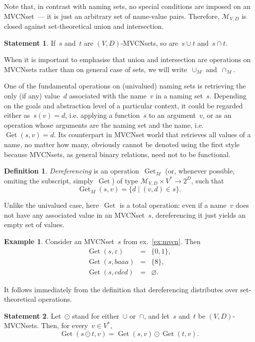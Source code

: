 \documentclass{article}
\theoremstyle{definition}
\newtheorem{Df}{Definition}
\newtheorem{St}{Statement}
\newtheorem{Ex}{Example}
\newcommand{\setcharmvcn}{M}
\newcommand{\setsymbol}[3]{\mathcal{#1}_{#2,#3}}
\newcommand{\setmvcn}[2]{\setsymbol{\setcharmvcn}{#1}{#2}}
\newcommand{\deref}{\operatorname{Get}}
\begin{document}
Note that, in contrast with naming sets, no special conditions are imposed
on an MVCNset~--- it is just an arbitrary set of name-value pairs.
Therefore, $\setmvcn{V}{D}$ is closed against set-theoretical union
and intersection.
\begin{St}\label{st:mvcn-setop}
If~$s$ and~$t$ are $(V,D)$-MVCNsets, so are~$s\cup t$ and~$s\cap t$.
\end{St}

When it is important to emphasise that union and intersection are operations
on MVCNsets rather than on general case of sets, we will
write~$\cup_\setcharmvcn$ and~$\cap_\setcharmvcn$.

One of the fundamental operations on (univalued) naming sets is retrieving
the only (if any) value~$d$ associated with the name~$v$ in a naming
set~$s$.  Depending on the goals and abstraction level of a particular
context, it could be regarded either as~$s(v)=d$, i.e. applying a function~$s$
to an argument~$v$, or as an operation whose arguments are the naming set and
the name, i.e.~$\deref(s, v)=d$. Its counterpart in MVCNset world that
retrieves all values of a name, no matter how many, obviously cannot be denoted
using the first style because MVCNsets, as general binary relations, need not
to be functional.

\begin{Df}\label{df:mvcn-dereferencing}
\emph{Dereferencing} is an operation~$\deref_\setcharmvcn$ (or, whenever
possible, omiting the subscript, simply~$\deref$) of type
$\setmvcn{V}{D} \times V^\ast \to 2^D$,
such that
\[
  \deref_\setcharmvcn(s, v) = \{ d \mid (v, d) \in s \} .
\]
\end{Df}

Unlike the univalued case, here~$\deref$ is a total operation: even if a
name~$v$ does not have any associated value in an MVCNset~$s$, dereferencing
it just yields an empty set of values.

\begin{Ex}\label{ex:mvcn-dereferencing}
Consider an MVCNset~$s$ from ex.~\ref{ex:mvcn}. Then
\begin{eqnarray*}
  \deref(s, \varepsilon) & = & \{ 0, 1 \}, \\
  \deref(s, baaa)        & = & \{ 8 \}, \\
  \deref(s, cdcd)        & = & \varnothing .
\end{eqnarray*}

\end{Ex}

It follows immediately from the definition that dereferencing distributes
over set-theoretical operations.
\begin{St}\label{st:mvcn-deref-distributivity}
Let~$\odot$ stand for either~$\cup$ or~$\cap$, and let~$s$ and~$t$ be
$(V,D)$-MVCNsets. Then, for every~$v\in V^\ast$,
\[
  \deref(s\odot t, v) = \deref(s, v) \odot \deref(t, v) .
\]
\end{St}
\end{document}
